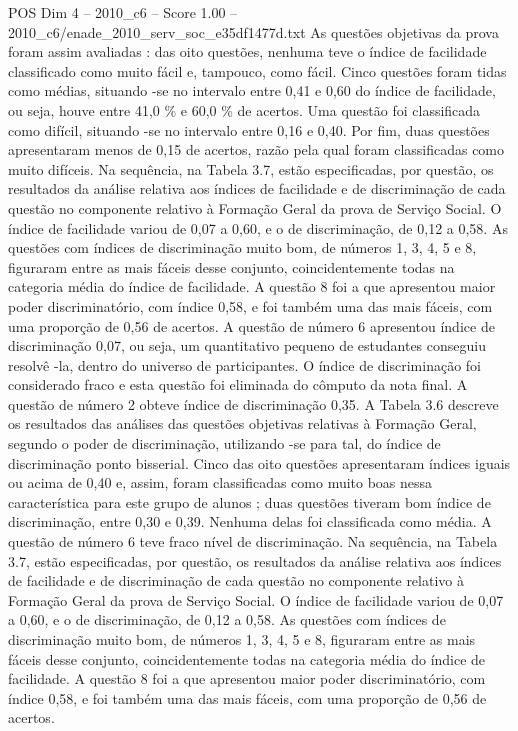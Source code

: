 \begin{textsample}{POS Dim 4 – 2010\_c6 – Score 1.00 – 2010\_c6/enade\_2010\_serv\_soc\_e35df1477d.txt}
As questões objetivas da prova foram assim avaliadas : das oito questões, nenhuma teve o índice de facilidade classificado como muito fácil e, tampouco, como fácil.
Cinco questões foram tidas como médias, situando -se no intervalo entre 0,41 e 0,60 do índice de facilidade, ou seja, houve entre 41,0 \% e 60,0 \% de acertos.
Uma questão foi classificada como difícil, situando -se no intervalo entre 0,16 e 0,40.
Por fim, duas questões apresentaram menos de 0,15 de acertos, razão pela qual foram classificadas como muito difíceis.
Na sequência, na Tabela 3.7, estão especificadas, por questão, os resultados da análise relativa aos índices de facilidade e de discriminação de cada questão no componente relativo à Formação Geral da prova de Serviço Social.
O índice de facilidade variou de 0,07 a 0,60, e o de discriminação, de 0,12 a 0,58.
As questões com índices de discriminação muito bom, de números 1, 3, 4, 5 e 8, figuraram entre as mais fáceis desse conjunto, coincidentemente todas na categoria média do índice de facilidade.
A questão 8 foi a que apresentou maior poder discriminatório, com índice 0,58, e foi também uma das mais fáceis, com uma proporção de 0,56 de acertos.
A questão de número 6 apresentou índice de discriminação 0,07, ou seja, um quantitativo pequeno de estudantes conseguiu resolvê -la, dentro do universo de participantes.
O índice de discriminação foi considerado fraco e esta questão foi eliminada do cômputo da nota final.
A questão de número 2 obteve índice de discriminação 0,35.
A Tabela 3.6 descreve os resultados das análises das questões objetivas relativas à Formação Geral, segundo o poder de discriminação, utilizando -se para tal, do índice de discriminação ponto bisserial.
Cinco das oito questões apresentaram índices iguais ou acima de 0,40 e, assim, foram classificadas como muito boas nessa característica para este grupo de alunos ; duas questões tiveram bom índice de discriminação, entre 0,30 e 0,39.
Nenhuma delas foi classificada como média.
A questão de número 6 teve fraco nível de discriminação.
Na sequência, na Tabela 3.7, estão especificadas, por questão, os resultados da análise relativa aos índices de facilidade e de discriminação de cada questão no componente relativo à Formação Geral da prova de Serviço Social.
O índice de facilidade variou de 0,07 a 0,60, e o de discriminação, de 0,12 a 0,58.
As questões com índices de discriminação muito bom, de números 1, 3, 4, 5 e 8, figuraram entre as mais fáceis desse conjunto, coincidentemente todas na categoria média do índice de facilidade.
A questão 8 foi a que apresentou maior poder discriminatório, com índice 0,58, e foi também uma das mais fáceis, com uma proporção de 0,56 de acertos.

\end{textsample}
